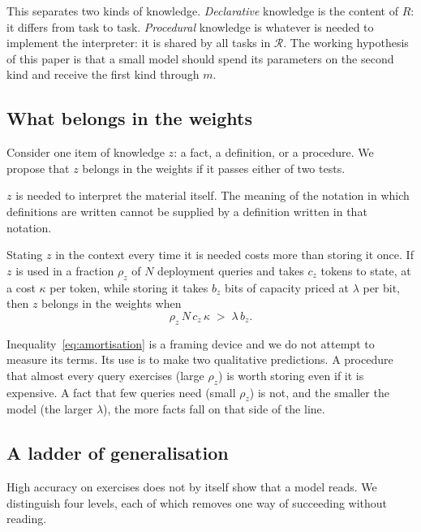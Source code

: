 \documentclass[11pt]{article}
\begin{document}
This separates two kinds of knowledge.
\emph{Declarative} knowledge is the content of $R$: it differs from task to task.
\emph{Procedural} knowledge is whatever is needed to implement the interpreter: it is shared by all tasks in $\mathcal{R}$.
The working hypothesis of this paper is that a small model should spend its parameters on the second kind and receive the first kind through $m$.

\subsection{What belongs in the weights}
\label{sec:criterion}

Consider one item of knowledge $z$: a fact, a definition, or a procedure.
We propose that $z$ belongs in the weights if it passes either of two tests.

\begin{description}[leftmargin=1.5em,itemsep=2pt]
\item[Bootstrap.] $z$ is needed to interpret the material itself. The meaning of the notation in which definitions are written cannot be supplied by a definition written in that notation.
\item[Amortisation.] Stating $z$ in the context every time it is needed costs more than storing it once. If $z$ is used in a fraction $\rho_z$ of $N$ deployment queries and takes $c_z$ tokens to state, at a cost $\kappa$ per token, while storing it takes $b_z$ bits of capacity priced at $\lambda$ per bit, then $z$ belongs in the weights when
\begin{equation}
\rho_z \, N \, c_z \, \kappa \;>\; \lambda \, b_z .
\label{eq:amortisation}
\end{equation}
\end{description}

Inequality~\eqref{eq:amortisation} is a framing device and we do not attempt to measure its terms.
Its use is to make two qualitative predictions.
A procedure that almost every query exercises (large $\rho_z$) is worth storing even if it is expensive.
A fact that few queries need (small $\rho_z$) is not, and the smaller the model (the larger $\lambda$), the more facts fall on that side of the line.

\subsection{A ladder of generalisation}
\label{sec:ladder}

High accuracy on exercises does not by itself show that a model reads.
We distinguish four levels, each of which removes one way of succeeding without reading.
\end{document}
